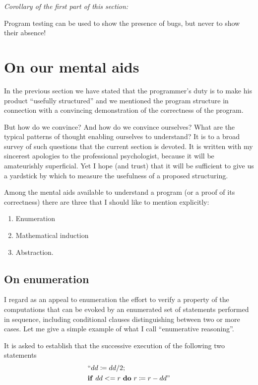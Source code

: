 \noindent
\textit{Corollary of the first part of this section:}
\nopagebreak

\noindent
Program testing can be used to show the presence of bugs, but never to show their absence!

\section{On our mental aids}
\label{sec:out-mental-aids}

In the previous section we have stated that the programmer's duty is to make his product ``usefully structured'' and we mentioned the program structure in connection with a convincing demonstration of the correctness of the program.

But how do we convince? And how do we convince ourselves? What are the typical patterns of thought enabling ourselves to understand? It is to a broad survey of such questions that the current section is devoted. It is written with my sincerest apologies to the professional psychologist, because it will be amateurishly superficial. Yet I hope (and trust) that it will be sufficient to give us a yardstick by which to measure the usefulness of a proposed structuring.

Among the mental aids available to understand a program (or a proof of its correctness) there are three that I should like to mention explicitly:

\begin{enumerate}[label=(\arabic*)]
\item Enumeration
\item Mathematical induction
\item Abstraction.
\end{enumerate}

\subsection{On enumeration}
\label{subsec:enumeration}

I regard as an appeal to enumeration the effort to verify a property of the computations that can be evoked by an enumerated set of statements performed in sequence, including conditional clauses distinguishing between two or more cases. Let me give a simple example of what I call ``enumerative reasoning''.

It is asked to establish that the successive execution of the following two statements
\begin{equation*}
	\begin{split}
		&\text{``}dd \coloneq dd/2; \\
		&\text{\textbf{if} } dd <= r \text{ \textbf{do} } r \coloneq r - dd\text{''}
	\end{split}
\end{equation*}

